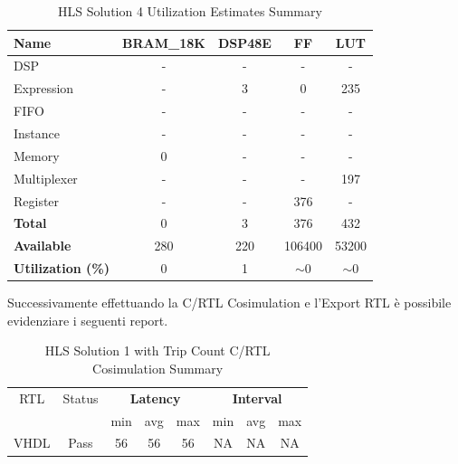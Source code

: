 \begin{table}[h]
	\centering
	\begin{tabular}{|l|c|c|c|c|}
		\hline
		\textbf{Name}    & \textbf{BRAM\_18K} & \textbf{DSP48E} & \textbf{FF} & \textbf{LUT} \\ \hline
		DSP              & -                   & -               & -           & -            \\ 
		Expression       & -                   & 3               & 0           & 235          \\ 
		FIFO             & -                   & -               & -           & -            \\ 
		Instance         & -                   & -               & -           & -            \\ 
		Memory           & 0                   & -               & -          & -            \\ 
		Multiplexer      & -                   & -               & -           & 197          \\ 
		Register         & -                   & -               & 376         & -            \\ \hline
		\textbf{Total}   & 0                   & 3               & 376         & 432          \\ \hline
		\textbf{Available} & 280               & 220             & 106400      & 53200        \\ \hline
		\textbf{Utilization (\%)} & 0            & 1               & $\sim$0     & $\sim$0      \\ \hline
	\end{tabular}
	\caption{HLS Solution 4 Utilization Estimates Summary}
	\label{tab:hls-solution-4-utilization-estimates-summary}
\end{table}

Successivamente effettuando la C/RTL Cosimulation e l'Export RTL è possibile evidenziare i seguenti report.

\begin{table}[H]
	\centering
	\begin{tabular}{|c|c|c|c|c|c|c|c|}
		\hline
		\multicolumn{1}{|c|}{RTL} & \multicolumn{1}{|c|}{Status} & \multicolumn{3}{c|}{\textbf{Latency}} & \multicolumn{3}{c|}{\textbf{Interval}} \\
		&  & min & avg & max & min & avg & max \\
		\hline
		VHDL & Pass & 56 & 56 & 56 & NA & NA & NA \\
		\hline
	\end{tabular}
	\caption{HLS Solution 1 with Trip Count C/RTL Cosimulation Summary }
	\label{tab:hls-solution-1-cosimulation-summary}
\end{table}

